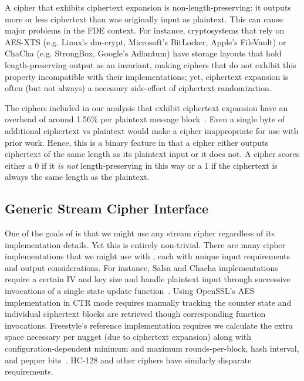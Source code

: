A cipher that exhibits ciphertext expansion is non-length-preserving: it outputs
more or less ciphertext than was originally input as plaintext. This can cause
major problems in the FDE context. For instance, cryptosystems that rely on
AES-XTS (e.g. Linux's dm-crypt, Microsoft's BitLocker, Apple's FileVault) or
ChaCha (e.g. StrongBox, Google's Adiantum) have storage layouts that hold
length-preserving output as an invariant, making ciphers that do not exhibit
this property incompatible with their implementations; yet, ciphertext expansion
is often (but not always) a necessary side-effect of ciphertext randomization.

The ciphers included in our analysis that exhibit ciphertext expansion have an
overhead of around 1.56\% per plaintext message block~\cite{Freestyle}. Even a
single byte of additional ciphertext vs plaintext would make a cipher
inappropriate for use with prior work. Hence, this is a binary feature in that a
cipher either outputs ciphertext of the same length as its plaintext input or it
does not. A cipher scores either a 0 if it \emph{is not} length-preserving in
this way or a 1 if the ciphertext is always the same length as the plaintext.

\subsection{Generic Stream Cipher Interface} \label{subsec:interface}

One of the goals of \sys{} is that we might use any stream cipher
regardless of its implementation details. Yet this is entirely non-trivial.
There are many cipher implementations that we might use with \sys{}, each
with unique input requirements and output considerations. For instance, Salsa
and Chacha implementations require a certain IV and key size and handle
plaintext input through successive invocations of a single state update
function~\cite{Floodyberry}. Using OpenSSL's AES implementation in CTR mode
requires manually tracking the counter state and individual ciphertext blocks
are retrieved though corresponding function invocations. Freestyle's reference
implementation requires we calculate the extra space necessary per nugget (due
to ciphertext expansion) along with configuration-dependent minimum and maximum
rounds-per-block, hash interval, and pepper bits~\cite{Freestyle}. HC-128 and
other ciphers have similarly disparate requirements.

